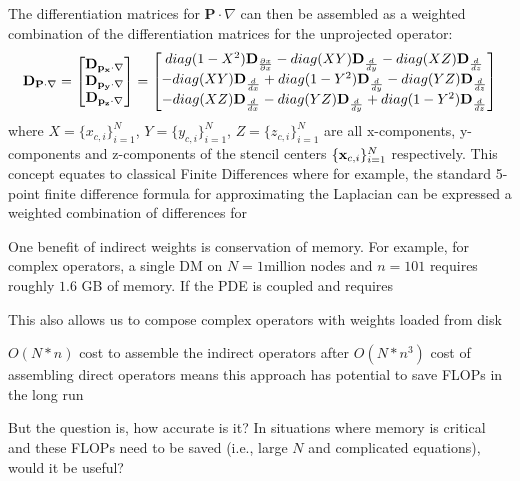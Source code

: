 The differentiation matrices for $\mathbf{P} \cdot \nabla$ can then be assembled as a weighted combination of the differentiation matrices for the unprojected operator: 
\begin{equation}
\mathbf{D}_{\mathbf{P} \cdot \nabla} = \begin{bmatrix} \mathbf{D}_{\mathbf{p_{x} \cdot \nabla}} \\  \mathbf{D}_{\mathbf{p_{y}\cdot \nabla}} \\  \mathbf{D}_{\mathbf{p_{z}\cdot \nabla}} \end{bmatrix} = \begin{bmatrix} 
diag(1-X^{2}) \mathbf{D}_{\frac{\partial x}{\partial x}} - diag(XY) \mathbf{D}_{\frac{d }{d y}} - diag(XZ) \mathbf{D}_{\frac{d }{d z}} \\
- diag(XY)\mathbf{D}_{\frac{d }{d x}} + diag(1-Y^{2}) \mathbf{D}_{\frac{d }{d y}} - diag(YZ) \mathbf{D}_{\frac{d }{d z}} \\
- diag(XZ)\mathbf{D}_{\frac{d }{d x}} - diag(YZ) \mathbf{D}_{\frac{d }{d y}} + diag(1-Y^{2}) \mathbf{D}_{\frac{d }{d z}} 
\end{bmatrix}
\end{equation}
 where $X = \{x_{c,i}\}_{i=1}^{N}$, $Y = \{y_{c,i}\}_{i=1}^{N}$, $Z = \{z_{c,i}\}_{i=1}^{N}$ are all x-components, y-components and z-components of the stencil centers $\{\mathbf{x}_{c,i}\}_{i=1}^{N}$ respectively. 
This concept equates to classical Finite Differences where for example, the standard 5-point finite difference formula for approximating the Laplacian can be expressed a weighted combination of differences for 


One benefit of indirect weights is conservation of memory. For example, for complex operators, a single DM on $N=1 \text{million}$ nodes and $n=101$ requires roughly $1.6$ GB of memory. If the PDE is coupled and requires 

This also allows us to compose complex operators with weights loaded from disk

$O(N*n)$ cost to assemble the indirect operators after $O(N*n^{3})$ cost of assembling direct operators means this approach has potential to save FLOPs in the long run

But the question is, how accurate is it? In situations where memory is critical and these FLOPs need to be saved (i.e., large $N$ and complicated equations), would it be useful?

